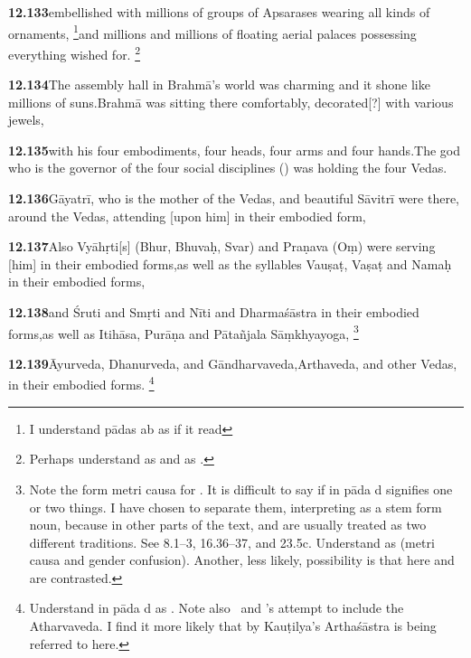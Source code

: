 \textbf{12.133}embellished with millions of groups of Apsarases wearing all kinds of ornaments,%
\footnote{I understand pādas ab as if it read   }and millions and millions of floating aerial palaces possessing everything wished for.%
\footnote{Perhaps understand  as  and                  as .  }%


\textbf{12.134}The assembly hall in Brahmā's world was charming and it shone like millions of suns.Brahmā was sitting there comfortably, decorated[?] with various jewels,%


\textbf{12.135}with his four embodiments, four heads, four arms and four hands.The god who is the governor of the four social disciplines ()                                                was holding the four Vedas.%


\textbf{12.136}Gāyatrī, who is the mother of the Vedas, and beautiful Sāvitrī                were there, around the Vedas, attending [upon him] in their embodied form,%


\textbf{12.137}Also Vyāhṛti[s] (Bhur, Bhuvaḥ, Svar) and Praṇava (Oṃ) were serving [him] in their embodied forms,as well as the syllables Vauṣaṭ, Vaṣaṭ and Namaḥ in their embodied forms,%


\textbf{12.138}and Śruti and Smṛti and Nīti and Dharmaśāstra in their embodied forms,as well as Itihāsa, Purāṇa and Pātañjala Sāṃkhyayoga,%
\footnote{Note the form  metri causa for .                 It is difficult to say if  in pāda d signifies one or two                 things. I have chosen to separate them, interpreting  as a stem form                 noun, because in other parts of the text,  and  are usually treated as                 two different traditions. See 8.1--3, 16.36--37, and 23.5c.                  Understand  as  (metri causa and gender confusion).                 Another, less likely, possibility is that here  and                  are contrasted.  }%


\textbf{12.139}Āyurveda, Dhanurveda, and Gāndharvaveda,Arthaveda, and other Vedas, in their embodied forms.%
\footnote{Understand  in pāda d as . Note also \msCb\ and \msCc's                 attempt to include the Atharvaveda. I find it more likely that by                  Kauṭilya's Arthaśāstra is being referred to here.  }%


